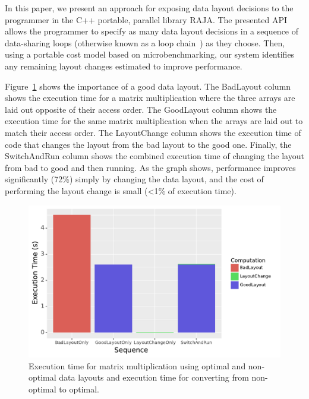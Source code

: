 \documentclass[sigconf,review=true]{acmart}
\begin{document}
In this paper, we present an approach for exposing data layout decisions to the programmer in the C++ portable, parallel library RAJA.
The presented API allows the programmer to specify as many data layout decisions in a sequence of data-sharing loops (otherwise known as a loop chain~\cite{krieger2013loop}) as they choose.
Then, using a portable cost model based on microbenchmarking, our system identifies any remaining layout changes estimated to improve performance.  

Figure~\ref{IntroExample} shows the importance of a good data layout. 
The BadLayout column shows the execution time for a matrix multiplication where the three arrays are laid out opposite of their access order. 
The GoodLayout column shows the execution time for the same matrix multiplication when the arrays are laid out to match their access order.
The LayoutChange column shows the execution time of code that changes the layout from the bad layout to the good one.
Finally, the SwitchAndRun column shows the combined execution time of changing the layout from bad to good and then running.
As the graph shows, performance improves  significantly (72\%) simply by changing the data layout, and the cost of performing the layout change is small (<1\% of execution time). 

\begin{figure}
	\includegraphics[width=\columnwidth]{IntroExampleGraph.pdf}
	\caption{Execution time for matrix multiplication using optimal and non-optimal data layouts and execution time for converting from non-optimal to optimal.}
	\label{IntroExample}
\end{figure}
\end{document}
